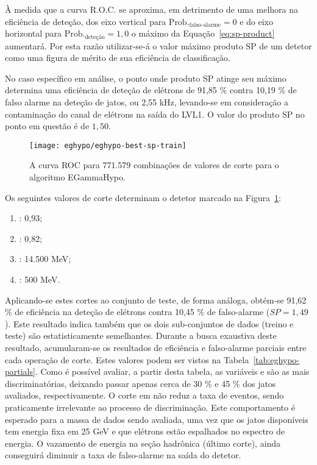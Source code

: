 À medida que a curva R.O.C. se aproxima, em detrimento de uma melhora na
eficiência de deteção, dos eixo vertical para
$\text{Prob.}_\text{falso-alarme} = 0$ e do eixo horizontal para
$\text{Prob.}_\text{deteção} = 1,0$ o máximo da Equação~\ref{eq:sp-product}
aumentará. Por esta razão utilizar-se-á o valor máximo produto SP de um
detetor como uma figura de mérito de sua eficiência de classificação.

No caso específico em análise, o ponto onde produto SP atinge seu máximo
determina uma eficiência de deteção de elétrons de 91,85 \% contra 10,19 \% de
falso alarme na deteção de jatos, ou 2,55 kHz, levando-se em consideração a
contaminação do canal de elétrons na saída do LVL1. O valor do produto SP no
ponto em questão é de $1,50$.

\begin{figure}
\begin{center}
\texttt{[image: eghypo/eghypo-best-sp-train]}
\end{center}
\caption{A curva ROC para 771.579 combinações de valores de corte para o
algoritmo EGammaHypo.}
\label{fig:eghypo-best-sp-train}
\end{figure}

Os seguintes valores de corte determinam o detetor marcado na
Figura~\ref{fig:eghypo-best-sp-train}:
\begin{enumerate}
\item \rcore: 0,93;
\item \eratio: 0,82;
\item \etem: 14.500 MeV;
\item \ethad: 500 MeV.
\end{enumerate}

Aplicando-se estes cortes ao conjunto de teste, de forma análoga, obtém-se
91,62 \% de eficiência na deteção de elétrons contra 10,45 \% de falso-alarme
($SP = 1,49$). Este resultado indica também que os dois sub-conjuntos de dados
(treino e teste) são estatisticamente semelhantes. Durante a busca exaustiva
deste resultado, acumularam-se os resultados de eficiência e falso-alarme
parciais entre cada operação de corte. Estes valores podem ser vistos na
Tabela~\ref{tab:eghypo-partials}. Como é possível avaliar, a partir desta
tabela, as variáveis \rcore e \eratio são as mais discriminatórias, deixando
passar apenas cerca de 30 \% e 45 \% dos jatos avaliados, respectivamente. O
corte em \etem não reduz a taxa de eventos, sendo praticamente irrelevante ao
processo de discriminação. Este comportamento é esperado para a massa de dados
sendo avaliada, uma vez que os jatos disponíveis tem energia fixa em 25 GeV e
que elétrons estão espalhados no espectro de energia. O vazamento de energia
na seção hadrônica (último corte), ainda conseguirá diminuir a taxa de
falso-alarme na saída do detetor.

